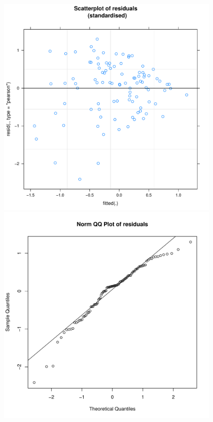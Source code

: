 \begin{CJK}{UTF8}{gbsn}
\begin{figure}[htbp]
              \includegraphics[scale =.4]{images/MLM3aScatter.pdf}
              \includegraphics[scale =.4]{images/MLM3aQQNorm.pdf}

\end{figure}
\end{CJK}
